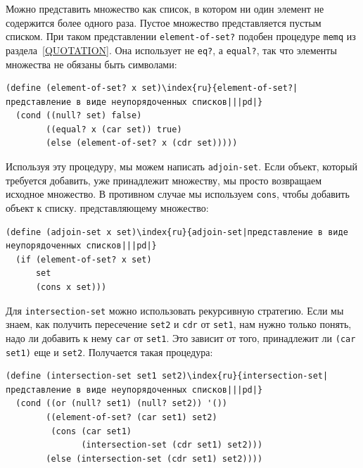 Можно представить множество как список, в котором ни один 
элемент не содержится более одного раза.  Пустое множество
представляется пустым списком.  При таком представлении
{\tt element-of-set?} подобен процедуре {\tt memq} из
раздела~\ref{QUOTATION}.  Она использует не
{\tt eq?}, а {\tt equal?}, так что элементы множества не 
обязаны быть символами:

\begin{Verbatim}[fontsize=\small]
(define (element-of-set? x set)\index{ru}{element-of-set?|представление в виде неупорядоченных списков|||pd|}
  (cond ((null? set) false)
        ((equal? x (car set)) true)
        (else (element-of-set? x (cdr set)))))
\end{Verbatim}
Используя эту процедуру, мы можем написать
{\tt adjoin-set}. Если объект, который требуется добавить, уже
принадлежит множеству, мы просто возвращаем исходное множество.  В
противном случае мы используем {\tt cons}, чтобы добавить
объект к списку. представляющему множество:

\begin{Verbatim}[fontsize=\small]
(define (adjoin-set x set)\index{ru}{adjoin-set|представление в виде неупорядоченных списков|||pd|}
  (if (element-of-set? x set)
      set
      (cons x set)))
\end{Verbatim}
Для {\tt intersection-set} можно использовать рекурсивную
стратегию.  Если мы знаем, как получить пересечение {\tt set2} и 
{\tt cdr} от {\tt set1}, нам нужно только понять, надо
ли добавить к нему {\tt car} от {\tt set1}.  Это зависит 
от того, принадлежит ли {\tt (car set1)} еще и
{\tt set2}.  Получается такая процедура:

\begin{Verbatim}[fontsize=\small]
(define (intersection-set set1 set2)\index{ru}{intersection-set|представление в виде неупорядоченных списков|||pd|}
  (cond ((or (null? set1) (null? set2)) '())
        ((element-of-set? (car set1) set2)
         (cons (car set1)
               (intersection-set (cdr set1) set2)))
        (else (intersection-set (cdr set1) set2))))
\end{Verbatim}

